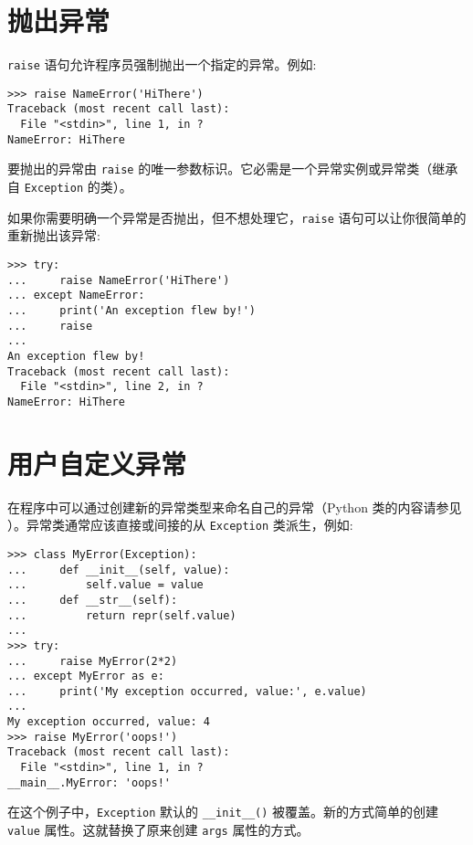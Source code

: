\section{抛出异常}
\texttt{raise} 语句允许程序员强制抛出一个指定的异常。例如:
\begin{lstlisting}
>>> raise NameError('HiThere')
Traceback (most recent call last):
  File "<stdin>", line 1, in ?
NameError: HiThere
\end{lstlisting}
要抛出的异常由 \texttt{raise} 的唯一参数标识。它必需是一个异常实例或异常类（继承自 \texttt{Exception} 的类）。

如果你需要明确一个异常是否抛出，但不想处理它，\texttt{raise} 语句可以让你很简单的重新抛出该异常:
\begin{lstlisting}
>>> try:
...     raise NameError('HiThere')
... except NameError:
...     print('An exception flew by!')
...     raise
...
An exception flew by!
Traceback (most recent call last):
  File "<stdin>", line 2, in ?
NameError: HiThere
\end{lstlisting}
\section{用户自定义异常}
在程序中可以通过创建新的异常类型来命名自己的异常（Python 类的内容请参见  ）。异常类通常应该直接或间接的从 \texttt{Exception} 类派生，例如:
\begin{lstlisting}
>>> class MyError(Exception):
...     def __init__(self, value):
...         self.value = value
...     def __str__(self):
...         return repr(self.value)
...
>>> try:
...     raise MyError(2*2)
... except MyError as e:
...     print('My exception occurred, value:', e.value)
...
My exception occurred, value: 4
>>> raise MyError('oops!')
Traceback (most recent call last):
  File "<stdin>", line 1, in ?
__main__.MyError: 'oops!'
\end{lstlisting}
在这个例子中，\texttt{Exception} 默认的 \verb|__init__()| 被覆盖。新的方式简单的创建 \texttt{value} 属性。这就替换了原来创建 \texttt{args} 属性的方式。

